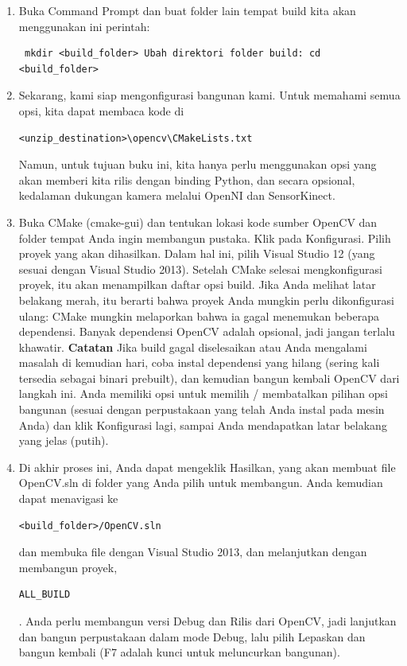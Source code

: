 \begin{enumerate}
\begin{figure}[ht]
		\caption{Download self-extracting}
		\label{contoh}
		\end{figure}
\newpage
	Jalankan ZIP yang mengekstraksi sendiri, dan ketika diminta, masukkan folder tujuan apa pun, yang akan kita sebut sebagai \begin{verbatim} <unzip_destination>. Subfolder, <unzip_destination>\opencv \end{verbatim} kemudian dibuat.
	\item Buka Command Prompt dan buat folder lain tempat build kita akan menggunakan ini perintah:\begin{verbatim} mkdir <build_folder> Ubah direktori folder build: cd <build_folder> \end{verbatim}
	\item Sekarang, kami siap mengonfigurasi bangunan kami. Untuk memahami semua opsi, kita dapat membaca kode di \begin{verbatim}<unzip_destination>\opencv\CMakeLists.txt \end{verbatim} Namun, untuk tujuan buku ini, kita hanya perlu menggunakan opsi yang akan memberi kita rilis dengan binding Python, dan secara opsional, kedalaman dukungan kamera melalui OpenNI dan SensorKinect.
	\item Buka CMake (cmake-gui) dan tentukan lokasi kode sumber OpenCV dan folder tempat Anda ingin membangun pustaka. Klik pada Konfigurasi. Pilih proyek yang akan dihasilkan. Dalam hal ini, pilih Visual Studio 12 (yang sesuai dengan Visual Studio 2013). Setelah CMake selesai mengkonfigurasi proyek, itu akan menampilkan daftar opsi build. Jika Anda melihat latar belakang merah, itu berarti bahwa proyek Anda mungkin perlu dikonfigurasi ulang: CMake mungkin melaporkan bahwa ia gagal menemukan beberapa dependensi. Banyak dependensi OpenCV adalah opsional, jadi jangan terlalu khawatir. \textbf{Catatan}  Jika build gagal diselesaikan atau Anda mengalami masalah di kemudian hari, coba instal dependensi yang hilang (sering kali tersedia sebagai binari prebuilt), dan kemudian bangun kembali OpenCV dari langkah ini. Anda memiliki opsi untuk memilih / membatalkan pilihan opsi bangunan (sesuai dengan perpustakaan yang telah Anda instal pada mesin Anda) dan klik Konfigurasi lagi, sampai Anda mendapatkan latar belakang yang jelas (putih).
	\item Di akhir proses ini, Anda dapat mengeklik Hasilkan, yang akan membuat file OpenCV.sln di folder yang Anda pilih untuk membangun. Anda kemudian dapat menavigasi ke \begin{verbatim}<build_folder>/OpenCV.sln\end{verbatim} dan membuka file dengan Visual Studio 2013, dan melanjutkan dengan membangun proyek, \begin{verbatim}ALL_BUILD\end{verbatim}. Anda perlu membangun versi Debug dan Rilis dari OpenCV, jadi lanjutkan dan bangun perpustakaan dalam mode Debug, lalu pilih Lepaskan dan bangun kembali (F7 adalah kunci untuk meluncurkan bangunan).

\end{enumerate}
